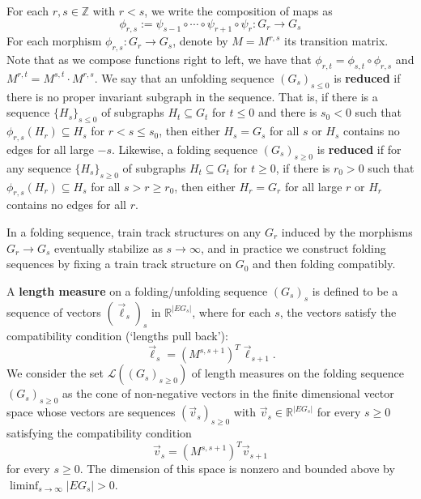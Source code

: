 \documentclass[11pt, letterpaper]{amsart}
\theoremstyle{plain}
\theoremstyle{definition}
\newcommand{\R}{\mathbb{R}}
\newcommand{\cL}{\mathcal{L}}
\begin{document}
For each $r, s\in \mathbb{Z}$ with $r < s$,
we write the composition of maps as
\[
  \phi_{r,s}:= \psi_{s-1}  \circ \cdots \circ \psi_{r+1} \circ \psi_{r}: G_r \to G_s 
\]
For each morphism
$\phi_{r,s}:G_r \to G_s$, denote by $M=M^{r,s}$ its transition matrix. Note that
as we compose functions right to left, we have that $\phi_{r,t} = \phi_{s,t}\circ
\phi_{r,s}$ and $M^{r,t} = M^{s,t}\cdot M^{r,s}$.
We say that an unfolding sequence $(G_s)_{s \le 0}$ is \textbf{reduced} if 
there is no proper invariant subgraph in the sequence. That is, if there is a
sequence $\{H_s\}_{s \le 0}$ of subgraphs $H_t\subseteq G_t$ for $t\leq 0$
and there is $s_0 < 0$ such that $\phi_{r,s}(H_r)\subseteq H_s$ for $r<s\leq s_0$, then either
$H_s=G_s$ for all $s$ or $H_s$ contains no edges for all large $-s$. 
Likewise, a folding sequence $(G_s)_{s \ge 0}$ is \textbf{reduced} if for any sequence $\{H_s\}_{s \ge 0}$ of subgraphs $H_t\subseteq G_t$ for
$t\geq 0$, if there is $r_0>0$ such that
$\phi_{r,s}(H_r)\subseteq H_s$ for all $s>r\ge r_0$, then either $H_r = G_r$ for
all large $r$ or $H_r$ contains no edges for all $r$.



In a folding sequence, train track structures on any $G_r$ induced by
the morphisms $G_r\to G_s$ eventually stabilize as $s\to\infty$, and
in practice we construct folding sequences by fixing a train track
structure on $G_0$ and then folding compatibly.

A \textbf{length measure} on a folding/unfolding sequence $(G_s)_s$ is defined
to be a sequence of vectors $(\vec{\ell}_s)_{s}$ in $\R^{|EG_s|}$, where for each
$s$, the vectors satisfy the compatibility condition (`lengths pull
back'):
\[
  \vec{\ell}_s = (M^{s,s+1})^T\vec{\ell}_{s+1}.
\]
We consider the set $\cL((G_s)_{s\ge 0})$ of length measures on the folding sequence
$(G_s)_{s \ge 0}$ as the cone of non-negative vectors in the finite dimensional
vector space whose vectors are sequences $(\vec{v}_s)_{s \ge 0}$ with $\vec{v}_s
\in \R^{|EG_s|}$ for every $s \ge 0$ satisfying the compatibility condition
\[
  \vec{v}_{s} = (M^{s,s+1})^T\vec{v}_{s+1}
\]
for every $s \ge 0$. The dimension of this space is nonzero and bounded above by $\liminf_{s
  \to \infty} |EG_s|>0$.
\end{document}
